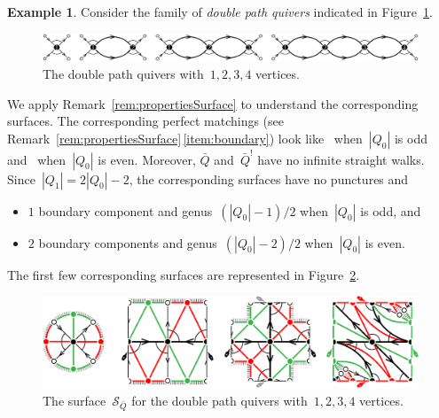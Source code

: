 \documentclass{amsart}
\theoremstyle{definition}
\newtheorem{example}[theorem]{Example}
\newcommand{\fref}[1]{Figure~\ref{#1}} %
\newcommand{\darkblue}{\color{darkblue}} %
\newcommand{\defn}[1]{\textsl{\darkblue #1}} %
\newcommand{\surface}{\mathcal{S}} %
\newcommand{\koszul}{^!} %
\begin{document}
\begin{example}
\label{exm:doublePath}
Consider the family of \defn{double path quivers} indicated in \fref{fig:doublePathsQuivers}.

\begin{figure}[h]
	\capstart
	\centerline{\includegraphics[scale=.45]{doublePathsQuivers}}
	\caption{The double path quivers with~$1, 2, 3, 4$ vertices.}
	\label{fig:doublePathsQuivers}
\end{figure}

\enlargethispage{.2cm}
We apply Remark~\ref{rem:propertiesSurface} to understand the corresponding surfaces.
The corresponding perfect matchings (see Remark~\ref{rem:propertiesSurface}\,\eqref{item:boundary}) look like~ when~$|Q_0|$ is odd and~ when~$|Q_0|$ is even.
Moreover, $\bar Q$ and~$\bar Q\koszul$ have no infinite straight walks.
Since~$|Q_1| = 2|Q_0|-2$, the corresponding surfaces have no punctures and
\begin{itemize}
\item $1$ boundary component and genus~$(|Q_0|-1)/2$ when~$|Q_0|$ is odd, and 
\item $2$ boundary components and genus~$(|Q_0|-2)/2$ when~$|Q_0|$ is even.
\end{itemize}
The first few corresponding surfaces are represented in \fref{fig:doublePathsSurfaces}.

\begin{figure}[H]
	\capstart
	\centerline{\includegraphics[scale=.7]{doublePathsSurfaces}}
	\caption{The surface~$\surface_{\bar Q}$ for the double path quivers with~$1, 2, 3, 4$ vertices.}
	\label{fig:doublePathsSurfaces}
\end{figure}
\end{example}
\end{document}
